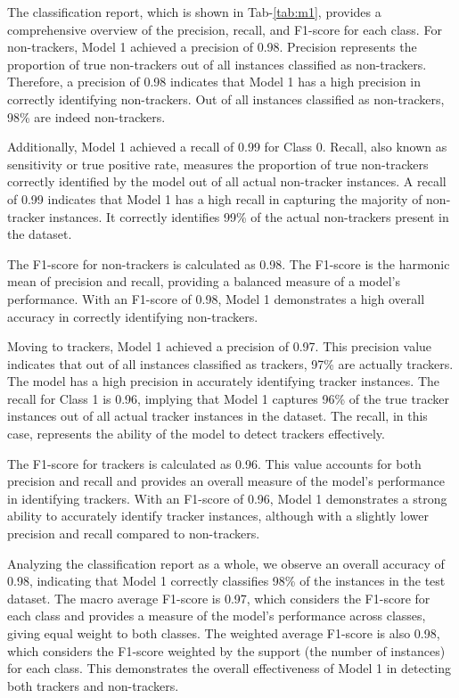 The classification report, which is shown in Tab-\ref{tab:m1}, provides a comprehensive overview of the precision, recall, and F1-score for each class.
For non-trackers, Model 1 achieved a precision of 0.98. Precision represents the proportion of true non-trackers
out of all instances classified as non-trackers. Therefore, a precision of 0.98 indicates that Model 1 has a high precision
in correctly identifying non-trackers. Out of all instances classified as non-trackers, 98\% are indeed non-trackers.

Additionally, Model 1 achieved a recall of 0.99 for Class 0. Recall, also known as sensitivity or true positive rate, measures
the proportion of true non-trackers correctly identified by the model out of all actual non-tracker instances. A recall of 0.99
indicates that Model 1 has a high recall in capturing the majority of non-tracker instances. It correctly identifies 99\% of the
actual non-trackers present in the dataset.

The F1-score for non-trackers is calculated as 0.98. The F1-score is the harmonic mean of precision and recall, providing a balanced
measure of a model's performance. With an F1-score of 0.98, Model 1 demonstrates a high overall accuracy in correctly identifying
non-trackers.

Moving to trackers, Model 1 achieved a precision of 0.97. This precision value indicates that out of all instances
classified as trackers, 97\% are actually trackers. The model has a high precision in accurately identifying tracker instances.
The recall for Class 1 is 0.96, implying that Model 1 captures 96\% of the true tracker instances out of all actual tracker
instances in the dataset. The recall, in this case, represents the ability of the model to detect trackers effectively.

The F1-score for trackers is calculated as 0.96. This value accounts for both precision and recall and provides an overall
measure of the model's performance in identifying trackers. With an F1-score of 0.96, Model 1 demonstrates a strong ability
to accurately identify tracker instances, although with a slightly lower precision and recall compared to non-trackers.

Analyzing the classification report as a whole, we observe an overall accuracy of 0.98, indicating that Model 1 correctly
classifies 98\% of the instances in the test dataset. The macro average F1-score is 0.97, which considers the F1-score
for each class and provides a measure of the model's performance across classes, giving equal weight to both classes.
The weighted average F1-score is also 0.98, which considers the F1-score weighted by the support (the number of instances)
for each class. This demonstrates the overall effectiveness of Model 1 in detecting both trackers and non-trackers.

